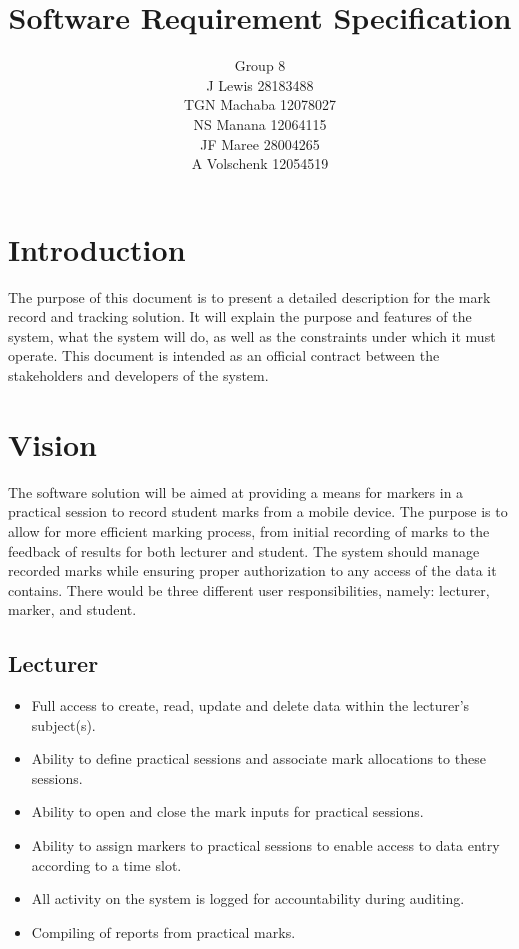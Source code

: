 \documentclass[a4paper]{article}
\begin{document}
	\title{\Huge{Software Requirement Specification}}
	\author{Group 8 \\ J Lewis	28183488\\
	TGN Machaba	12078027\\
	NS Manana	12064115\\
	JF Maree	28004265\\
	A Volschenk	12054519}
	\maketitle

	\section{Introduction}

		The purpose of this document is to present a detailed description for the mark record and tracking solution. It will explain the purpose and features of the system, what the system will do, as well as the constraints under which it must operate. This document is intended as an official contract between the stakeholders and developers of the system.

	\section{Vision}

		The software solution will be aimed at providing a means for markers in a practical session to record student marks from a mobile device. The purpose is to allow for more efficient marking process, from initial recording of marks to the feedback of results for both lecturer and student. The system should manage recorded marks while ensuring proper authorization to any access of the data it contains. There would be three different user responsibilities, namely: lecturer, marker, and student.
		
		\subsection{Lecturer}
			\begin{itemize}
				\item	Full access to create, read, update and delete data within the lecturer's subject(s).
				\item	Ability to define practical sessions and associate mark allocations to these sessions.
				\item	Ability to open and close the mark inputs for practical sessions.
				\item	Ability to assign markers to practical sessions to enable access to data entry according to a time slot.
				\item	All activity on the system is logged for accountability during auditing.
				\item	Compiling of reports from practical marks.
			\end{itemize}
\end{document}
